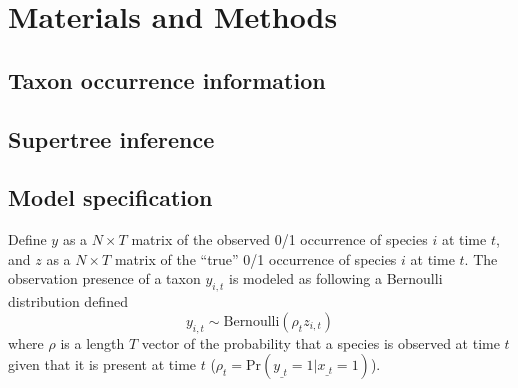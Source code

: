 \documentclass[12pt,letterpaper]{article}
\begin{document}
\section{Materials and Methods}

\subsection{Taxon occurrence information}


\subsection{Supertree inference}



\subsection{Model specification}


Define \(y\) as a \(N \times T\) matrix of the observed 0/1 occurrence of species \(i\) at time \(t\), and \(z\) as a \(N \times T\) matrix of the ``true'' 0/1 occurrence of species \(i\) at time \(t\). The observation presence of a taxon \(y_{i,t}\) is modeled as following a Bernoulli distribution defined
\begin{equation}
  y_{i,t} \sim \text{Bernoulli}(\rho_{t} z_{i,t})
  \label{eq:latent}
\end{equation}
where \(\rho\) is a length \(T\) vector of the probability that a species is observed at time \(t\) given that it is present at time \(t\) (\(\rho_{t} = \text{Pr}(y_{\_t} = 1 | x_{\_t} = 1)\)).
\end{document}

